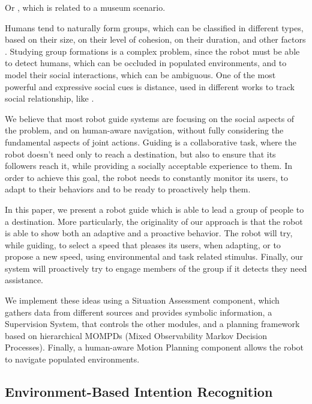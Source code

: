 %
Or \cite{rashed2015toward}, which is related to a museum scenario. 

Humans tend to naturally form groups, which can be classified in different types, based on their size, on their level of cohesion, on their duration, and other factors \cite{forsyth2009group}. %
Studying group formations is a complex problem, since the robot must be able to detect humans, which can be occluded in populated environments, and to model their social interactions, which can be ambiguous. One of the most powerful and expressive social cues is distance, used in different works to track social relationship, like \cite{luber2013multi}. 
%

We believe that most robot guide systems are focusing on the social aspects of the problem, and on human-aware navigation, without fully considering the fundamental aspects of joint actions. Guiding is a collaborative task, where the robot doesn't need only to reach a destination, but also to ensure that its followers reach it, while providing a socially acceptable experience to them. In order to achieve this goal, the robot needs to constantly monitor its users, to adapt to their behaviors and to be ready to proactively help them.

In this paper, we present a robot guide which is able to lead a group of people to a destination. More particularly, the originality of our approach is that the robot is able to show both an adaptive and a proactive behavior. The robot will try, while guiding, to select a speed that pleases its users, when adapting, or to propose a new speed, using environmental and task related stimulus. Finally, our system will proactively try to engage members of the group if it detects they need assistance. 

We implement these ideas using a Situation Assessment component, which gathers data from different sources and provides symbolic information, a Supervision System, that controls the other modules, and a planning framework based on hierarchical MOMPDs (Mixed Observability Markov Decision Processes). Finally, a human-aware Motion Planning component allows the robot to navigate populated environments.
\vspace{-10pt}

\subsection{Environment-Based Intention Recognition}

